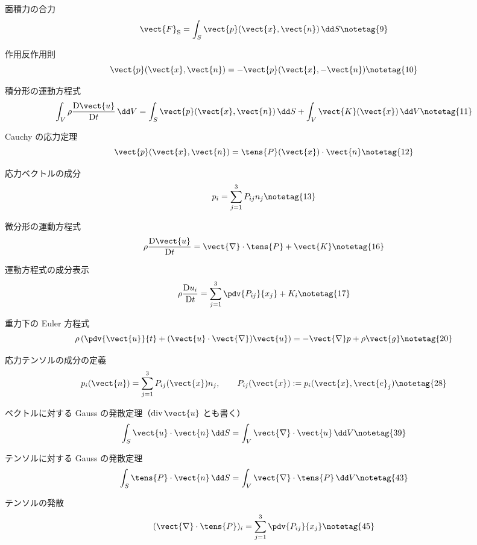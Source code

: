 \documentclass[uplatex,dvipdfmx,a4paper,11pt]{jsarticle}
\begin{document}
\begin{kirokuichiran}
\end{kirokuichiran}

\youtenseiri
\begin{noteshikilist}
  \item 面積力の合力 %
    \[ \vect{F}_{\mathrm{S}}=\int_S \vect{p}(\vect{x},\vect{n})\,\dd S \notetag{9} \]
  \item 作用反作用則 %
    \[ \vect{p}(\vect{x},\vect{n})=-\vect{p}(\vect{x},-\vect{n}) \notetag{10} \]
  \item 積分形の運動方程式 %
    \[ \int_V \rho\frac{\mathrm{D}\vect{u}}{\mathrm{D}t}\,\dd V=\int_S \vect{p}(\vect{x},\vect{n})\,\dd S+\int_V \vect{K}(\vect{x})\,\dd V \notetag{11} \]
  \item Cauchy の応力定理 %
    \[ \vect{p}(\vect{x},\vect{n})=\tens{P}(\vect{x})\cdot\vect{n} \notetag{12} \]
  \item 応力ベクトルの成分 %
    \[ p_i=\sum_{j=1}^{3}P_{ij}n_j \notetag{13} \]
  \item 微分形の運動方程式 %
    \[ \rho\frac{\mathrm{D}\vect{u}}{\mathrm{D}t}=\vect{\nabla}\cdot\tens{P}+\vect{K} \notetag{16} \]
  \item 運動方程式の成分表示 %
    \[ \rho\frac{\mathrm{D}u_i}{\mathrm{D}t}=\sum_{j=1}^{3}\pdv{P_{ij}}{x_j}+K_i \notetag{17} \]
  \item 重力下の Euler 方程式 %
    \[ \rho\left(\pdv{\vect{u}}{t}+(\vect{u}\cdot\vect{\nabla})\vect{u}\right)=-\vect{\nabla}p+\rho\vect{g} \notetag{20} \]
  \item 応力テンソルの成分の定義 %
    \[ p_i(\vect{n})=\sum_{j=1}^{3}P_{ij}(\vect{x})n_j,\qquad P_{ij}(\vect{x}):=p_i(\vect{x},\vect{e}_j) \notetag{28} \]
  \item ベクトルに対する Gauss の発散定理（$\mathrm{div}\,\vect{u}$ とも書く） %
    \[ \int_S \vect{u}\cdot\vect{n}\,\dd S=\int_V \vect{\nabla}\cdot\vect{u}\,\dd V \notetag{39} \]
  \item テンソルに対する Gauss の発散定理 %
    \[ \int_S \tens{P}\cdot\vect{n}\,\dd S=\int_V \vect{\nabla}\cdot\tens{P}\,\dd V \notetag{43} \]
  \item テンソルの発散 %
    \[ (\vect{\nabla}\cdot\tens{P})_i=\sum_{j=1}^{3}\pdv{P_{ij}}{x_j} \notetag{45} \]
\end{noteshikilist}
\end{document}
